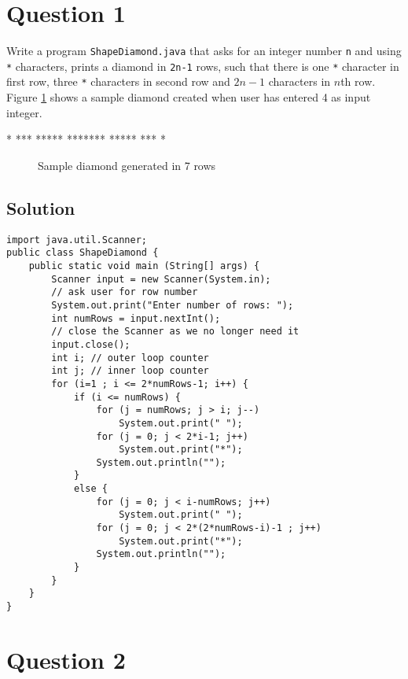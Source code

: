 \documentclass[12pt,letterpaper,twoside]{article}
\begin{document}


\section*{Question 1}

Write a program \texttt{ShapeDiamond.java} that asks for an integer number \texttt{n} and using \texttt{*} characters, prints a diamond in \texttt{2n-1} rows, such that there is one \texttt{*} character in first row, three \texttt{*} characters in second row and $2n-1$ characters in $n$th row.
Figure \ref{fig1} shows a sample diamond created when user has entered 4 as input integer.
\begin{verbbox}
   *
  ***
 *****
*******
 *****
  ***
   *
\end{verbbox}
\begin{figure}[H]\centering
\theverbbox
\caption{Sample diamond generated in 7 rows} \label{fig1}
\end{figure}

\subsection*{Solution}

\lstset{language=Java}
\lstset{tabsize=2}
\begin{lstlisting}
import java.util.Scanner;
public class ShapeDiamond {
	public static void main (String[] args) {
		Scanner input = new Scanner(System.in);
		// ask user for row number
		System.out.print("Enter number of rows: ");
		int numRows = input.nextInt();
		// close the Scanner as we no longer need it
		input.close();
		int i; // outer loop counter
		int j; // inner loop counter
		for (i=1 ; i <= 2*numRows-1; i++) {
			if (i <= numRows) {
				for (j = numRows; j > i; j--)
					System.out.print(" ");
				for (j = 0; j < 2*i-1; j++)
					System.out.print("*");
				System.out.println("");
			}
			else {
				for (j = 0; j < i-numRows; j++)
					System.out.print(" ");
				for (j = 0; j < 2*(2*numRows-i)-1 ; j++)
					System.out.print("*");
				System.out.println("");
			}
		}
	}
}
\end{lstlisting}

\section*{Question 2}
\end{document}
